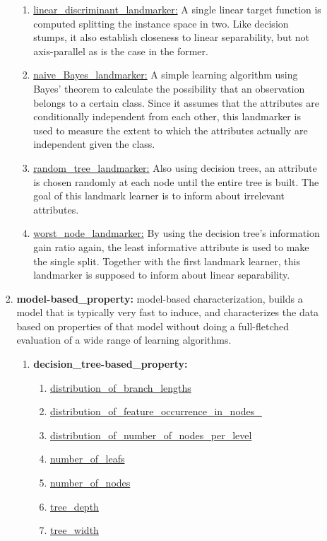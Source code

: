 \documentclass[a4paper,12pt, english]{article}
\begin{document}
\begin{enumerate}
\begin{enumerate}
\begin{enumerate}
\begin{enumerate}
				\item \underline{linear\_discriminant\_landmarker:}  A single linear target function is computed splitting the instance space in two. Like decision stumps, it also establish closeness to linear separability, but not axis-parallel as is the case in the former.
				\item \underline{naive\_Bayes\_landmarker:}  A simple learning algorithm using Bayes’ theorem to calculate the possibility that an observation belongs to a certain class. Since it assumes that the attributes are conditionally independent from each other, this landmarker is used to measure the extent to which the attributes actually are independent given the class.
				\item \underline{random\_tree\_landmarker:}  Also using decision trees, an attribute is chosen randomly at each node until the entire tree is built. The goal of this landmark learner is to inform about irrelevant attributes.
				\item \underline{worst\_node\_landmarker:} By using the decision tree’s information gain ratio again, the least informative attribute is used to make the single split. Together with the first landmark learner, this landmarker is supposed to inform about linear separability.
				\end{enumerate}			
			\item \textbf{model-based\_property:} model-based characterization, builds a model that is typically very fast to induce, and characterizes the data based on properties of that model without doing a full-fletched evaluation of a wide range of learning algorithms.
				\begin{enumerate}
				\item \textbf{decision\_tree-based\_property:}
					\begin{enumerate}
					\item \underline{distribution\_of\_branch\_lengths}
					\item \underline{distribution\_of\_feature\_occurrence\_in\_nodes\_}
					\item \underline{distribution\_of\_number\_of\_nodes\_per\_level}
					\item \underline{number\_of\_leafs}
					\item \underline{number\_of\_nodes}
					\item \underline{tree\_depth}
					\item \underline{tree\_width}
					\end{enumerate}				
				\end{enumerate}			

\end{enumerate}
\end{enumerate}
\end{enumerate}
\end{document}
